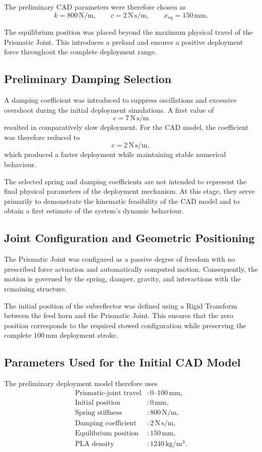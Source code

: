 The preliminary CAD parameters were therefore chosen as
\[
k=800\,\mathrm{N/m},
\qquad
c=2\,\mathrm{N\,s/m},
\qquad
x_{\mathrm{eq}}=150\,\mathrm{mm}.
\]

The equilibrium position was placed beyond the maximum physical travel of the Prismatic Joint. This introduces a preload and ensures a positive deployment force throughout the complete deployment range.

\subsection{Preliminary Damping Selection}

A damping coefficient was introduced to suppress oscillations and excessive overshoot during the initial deployment simulations. A first value of
\[
c=7\,\mathrm{N\,s/m}
\]
resulted in comparatively slow deployment. For the CAD model, the coefficient was therefore reduced to
\[
c=2\,\mathrm{N\,s/m},
\]
which produced a faster deployment while maintaining stable numerical behaviour.

The selected spring and damping coefficients are not intended to represent the final physical parameters of the deployment mechanism. At this stage, they serve primarily to demonstrate the kinematic feasibility of the CAD model and to obtain a first estimate of the system's dynamic behaviour.

\subsection{Joint Configuration and Geometric Positioning}

The Prismatic Joint was configured as a passive degree of freedom with no prescribed force actuation and automatically computed motion. Consequently, the motion is governed by the spring, damper, gravity, and interactions with the remaining structure.

The initial position of the subreflector was defined using a Rigid Transform between the feed horn and the Prismatic Joint. This ensures that the zero position corresponds to the required stowed configuration while preserving the complete $100\,\mathrm{mm}$ deployment stroke.

\subsection{Parameters Used for the Initial CAD Model}

The preliminary deployment model therefore uses
\[
\begin{aligned}
	\text{Prismatic-joint travel} &: 0\text{--}100\,\mathrm{mm},\\
	\text{Initial position} &: 0\,\mathrm{mm},\\
	\text{Spring stiffness} &: 800\,\mathrm{N/m},\\
	\text{Damping coefficient} &: 2\,\mathrm{N\,s/m},\\
	\text{Equilibrium position} &: 150\,\mathrm{mm},\\
	\text{PLA density} &: 1240\,\mathrm{kg/m^3}.
\end{aligned}
\]

